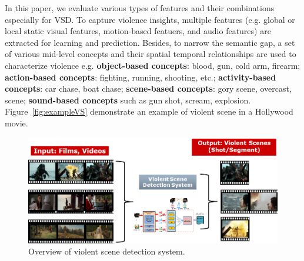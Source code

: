 \documentclass[twocolumn]{bmcart}%
\begin{document}
In this paper, we evaluate various types of features and their combinations especially for VSD. To capture violence insights, multiple features \cite{demarty2014benchmarking} (e.g. global or local static visual features, motion-based featuers, and audio features) are extracted for learning and prediction. Besides, to narrow the semantic gap, a set of various mid-level concepts and their spatial temporal relationships are used to characterize violence e.g. {\bf object-based concepts}: blood,  gun, cold arm, firearm; {\bf action-based concepts}: fighting, running, shooting, etc.; {\bf activity-based concepts}: car chase, boat chase; {\bf scene-based concepts}: gory scene, overcast, scene; {\bf sound-based concepts} such as gun shot, scream, explosion. Figure~\ref{fig:exampleVS} demonstrate an example of violent scene in a Hollywood movie. %
\begin{figure}[!t]
	\centering
	\includegraphics[width=2\linewidth]{Images/SystemOverview.png}
	\caption{Overview of violent scene detection system.}
	\label{fig:systemoverview}
\end{figure}
\end{document}
